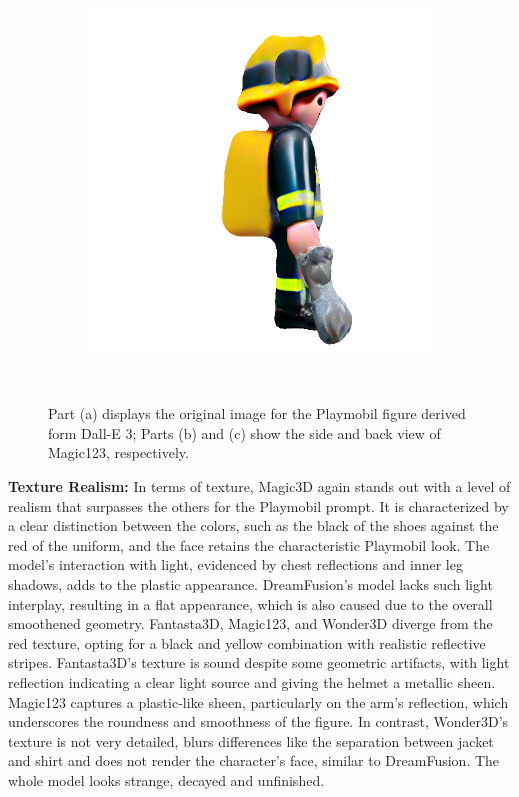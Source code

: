 \begin{figure}[ht]
\begin{subfigure}[b]{0.25\textwidth}
        \caption{}
    \end{subfigure}
    \begin{subfigure}[b]{0.25\textwidth}
        \centering
        \includegraphics[width=\textwidth]{figures/subjective/magic123_playmobil_refine_right_10000_part1.png}
        \caption{}
    \end{subfigure}
    \caption{Part (a) displays the original image for the Playmobil figure derived form Dall-E 3; Parts (b) and (c) show the side and back view of Magic123, respectively.}~\label{fig:inputPlaymobil}
\end{figure}

\textbf{Texture Realism:} In terms of texture, Magic3D again stands out with a level of realism that surpasses the others for the Playmobil prompt. It is characterized by a clear distinction between the colors, such as the black of the shoes against the red of the uniform, and the face retains the characteristic Playmobil look. The model's interaction with light, evidenced by chest reflections and inner leg shadows, adds to the plastic appearance. DreamFusion's model lacks such light interplay, resulting in a flat appearance, which is also caused due to the overall smoothened geometry. Fantasta3D, Magic123, and Wonder3D diverge from the red texture, opting for a black and yellow combination with realistic reflective stripes. Fantasta3D's texture is sound despite some geometric artifacts, with light reflection indicating a clear light source and giving the helmet a metallic sheen. Magic123 captures a plastic-like sheen, particularly on the arm's reflection, which underscores the roundness and smoothness of the figure. In contrast, Wonder3D's texture is not very detailed, blurs differences like the separation between jacket and shirt and does not render the character's face, similar to DreamFusion. The whole model looks strange, decayed and unfinished.

